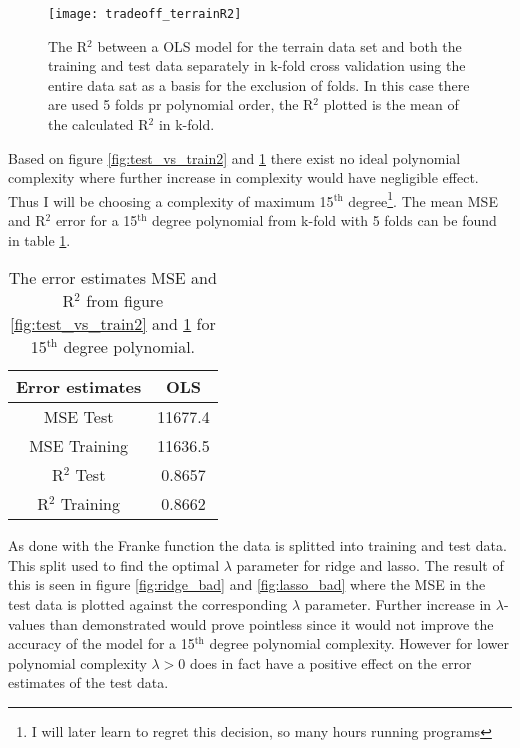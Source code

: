 \documentclass[uio,jmp,amsmath,amssymb,reprint,nofootinbib]{revtex4-1}
\numberwithin{equation}{section}
\begin{document}
\begin{figure}[H]
    \centering
    \texttt{[image: tradeoff\_terrainR2]}
    \caption{The R\(^2\) between a OLS model for the terrain data set and both the training and test data separately in k-fold cross validation using the entire data sat as a basis for the exclusion of folds. In this case there are used 5 folds pr polynomial order, the R\(^2\) plotted is the mean of the calculated R\(^2\) in k-fold.}
    \label{fig:test_vs_train3}
\end{figure}

Based on figure \ref{fig:test_vs_train2} and \ref{fig:test_vs_train3} there exist no ideal polynomial complexity where further increase in complexity would have negligible effect. Thus I will be choosing a complexity of maximum 15\(^\text{th}\) degree\footnote{I will later learn to regret this decision, so many hours running programs}. The mean MSE and R\(^2\) error for a 15\(^\text{th}\) degree polynomial from k-fold with 5 folds can be found in table \ref{tab:08}.

\begin{table}
\begin{tabular}{|c|c|}\hline
Error estimates & OLS\\ \hline
MSE Test & 11677.4 \\ \hline
MSE Training & 11636.5 \\ \hline
R\(^2\) Test & 0.8657 \\ \hline
R\(^2\) Training & 0.8662 \\ \hline
\end{tabular}
\caption{The error estimates MSE and R\(^2\) from figure \ref{fig:test_vs_train2} and \ref{fig:test_vs_train3} for 15\(^\text{th}\) degree polynomial.}
\label{tab:08}
\end{table}

As done with the Franke function the data is splitted into training and test data. This split used to find the optimal \(\lambda\) parameter for ridge and lasso. The result of this is seen in figure \ref{fig:ridge_bad} and \ref{fig:lasso_bad} where the MSE in the test data is plotted against the corresponding \(\lambda\) parameter. Further increase in \(\lambda\)-values than demonstrated would prove pointless since it would not improve the accuracy of the model for a 15\(^\text{th}\) degree polynomial complexity. However for lower polynomial complexity \(\lambda > 0\) does in fact have a positive effect on the error estimates of the test data. 
\end{document}
